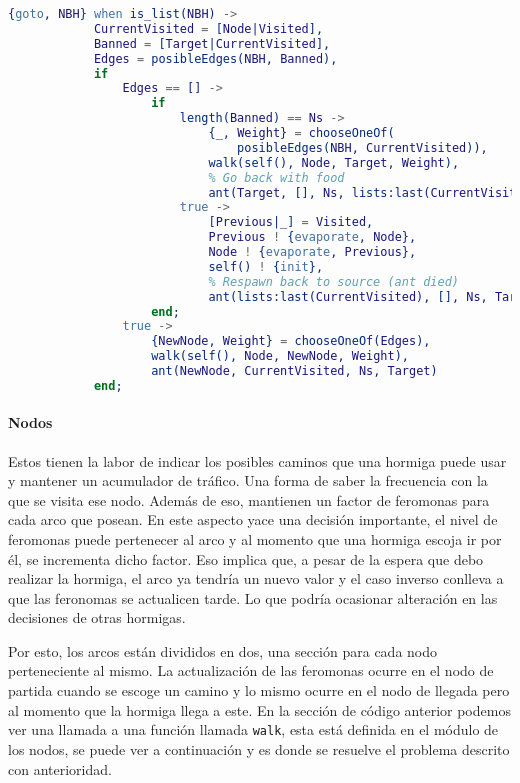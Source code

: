 \documentclass[
12pt, %
letterpaper, %
oneside, %
headinclude,footinclude, %
BCOR5mm, %
]{scrartcl}
\begin{document}
\begin{lstlisting}[language=Erlang]
        {goto, NBH} when is_list(NBH) ->
            CurrentVisited = [Node|Visited],
            Banned = [Target|CurrentVisited],
            Edges = posibleEdges(NBH, Banned),
            if
                Edges == [] ->
                    if
                        length(Banned) == Ns ->
                            {_, Weight} = chooseOneOf(
                                posibleEdges(NBH, CurrentVisited)),
                            walk(self(), Node, Target, Weight),
                            % Go back with food
                            ant(Target, [], Ns, lists:last(CurrentVisited));
                        true ->
                            [Previous|_] = Visited,
                            Previous ! {evaporate, Node},
                            Node ! {evaporate, Previous},
                            self() ! {init},
                            % Respawn back to source (ant died)
                            ant(lists:last(CurrentVisited), [], Ns, Target)
                    end;
                true ->
                    {NewNode, Weight} = chooseOneOf(Edges),
                    walk(self(), Node, NewNode, Weight),
                    ant(NewNode, CurrentVisited, Ns, Target)
            end;
\end{lstlisting}

\paragraph{Nodos}

Estos tienen la labor de indicar los posibles caminos que una hormiga puede usar y mantener un acumulador de tráfico. Una forma de saber la frecuencia con la que se visita ese nodo. Además de eso, mantienen un factor de feromonas para cada arco que posean. En este aspecto yace una decisión importante, el nivel de feromonas puede pertenecer al arco y al momento que una hormiga escoja ir por él, se incrementa dicho factor. Eso implica que, a pesar de la espera que debo realizar la hormiga, el arco ya tendría un nuevo valor y el caso inverso conlleva a que las feronomas se actualicen tarde. Lo que podría ocasionar alteración en las decisiones de otras hormigas.

Por esto, los arcos están divididos en dos, una sección para cada nodo perteneciente al mismo. La actualización de las feromonas ocurre en el nodo de partida cuando se escoge un camino y lo mismo ocurre en el nodo de llegada pero al momento que la hormiga llega a este. En la sección de código anterior podemos ver una llamada a una función llamada \texttt{walk}, esta está definida en el módulo de los nodos, se puede ver a continuación y es donde se resuelve el problema descrito con anterioridad.
\end{document}
